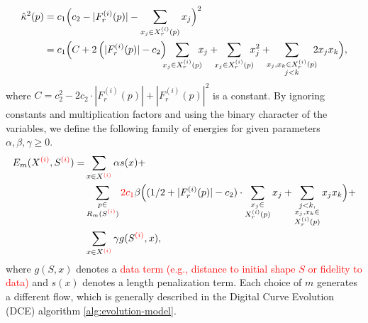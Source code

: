 \documentclass[smallextended]{svjour3}       %
\newcommand{\revision}[1]{\textcolor{red}{#1}}
\begin{document}
\begin{align*}
  \hat{\kappa}^2(p) &= c_1\Big( c_2 - |F_{r}^{(i)}(p)| - \sum_{x_j \in X_r^{(i)}(p)} {x_j} \Big)^2 \\
   &= c_1 \Big( C + 2\left( |F_{r}^{(i)}(p)| - c_2 \right) \hspace{-2mm}\sum_{x_j \in X_{r}^{(i)}(p)}\hspace{-2mm}{x_j} + \hspace{-2mm}\sum_{x_j \in X_{r}^{(i)}(p)}\hspace{-2mm}{x_j^2} + \hspace{-2mm}\sum_{ \substack{x_j,x_k \in X_{r}^{(i)}(p) \\ j<k} }\hspace{-2mm}{2x_jx_k}  \Big),
\end{align*}
where $C=c_2^2 - 2c_2 \cdot |F_{r}^{(i)}(p)| + |F_{r}^{(i)}(p)|^2$ is a constant. By ignoring constants and multiplication factors and using
the binary character of the variables, we define the following family
of energies for given parameters $\alpha,\beta, \gamma \geq 0$.
\begin{align}
  E_m(X^{\revision{(i)}},S^{\revision{(i)}}) =& \sum_{x \in X^{\revision{(i)}}}{\alpha s(x)} + \nonumber \\ 
  & \sum_{ \substack{p \in \\ R_m(S^{\revision{(i)}})}}{ \revision{2c_1} \beta  \Big( { (1/2+ |F_{r}^{(i)}(p)|-c_2) \cdot \sum_{ \substack{ x_j \in \\ X_{r}^{(i)}(p)}}{x_j} } + \sum_{ \substack{j<k, \\ x_j,x_k \in \\ X_{r}^{(i)}(p) } }{x_jx_k} \Big) } + \nonumber \\
  & \sum_{x \in X^{\revision{(i)}}}{\gamma g(S^{\revision{(i)}},x)},
  \label{eq:energy-family}
\end{align}
where $g(S,x)$ denotes a \revision{data term (e.g., distance to initial shape $S$ or fidelity to data)} and $s(x)$ denotes a length penalization term. Each choice of $m$ generates a different flow, which is generally described in the Digital Curve Evolution (DCE) algorithm \ref{alg:evolution-model}.
\end{document}
